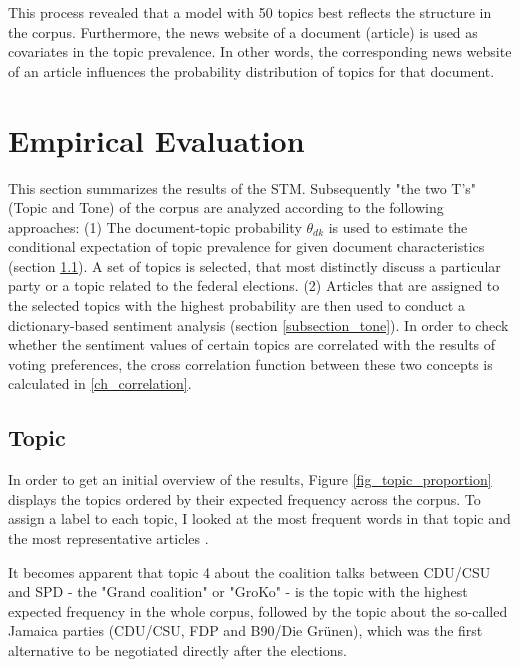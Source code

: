 \documentclass[12pt,a4paper,notitlepage]{article}
\begin{document}
This process revealed that a model with 50 topics best reflects the structure in the corpus. Furthermore, the news website of a document (article) is used as covariates in the topic prevalence. In other words, the corresponding news website of an article influences the probability distribution of topics for that document. 

\section{Empirical Evaluation}\label{ch_empirical}

This section summarizes the results of the STM. Subsequently "the two T's" (Topic and Tone) of the corpus are analyzed according to the following approaches: (1) The document-topic probability $\theta_{dk}$ is used to estimate the conditional expectation of topic prevalence for given document characteristics (section \ref{subsection_topic}). A set of topics is selected, that most distinctly discuss a particular party or a topic related to the federal elections. (2) Articles that are assigned to the selected topics with the highest probability are then used to conduct a dictionary-based sentiment analysis (section \ref{subsection_tone}). In order to check whether the sentiment values of certain topics are correlated with the results of voting preferences, the cross correlation function between these two concepts is calculated in \ref{ch_correlation}.

\subsection{Topic}\label{subsection_topic}

In order to get an initial overview of the results, Figure \ref{fig_topic_proportion} displays the topics ordered by their expected frequency across the corpus. To assign a label to each topic, I looked at the most frequent words in that topic and the most representative articles \citep{roberts_model_2016}. 

It becomes apparent that topic 4 about the coalition talks between CDU/CSU and SPD - the "Grand coalition" or "GroKo" - is the topic with the highest expected frequency in the whole corpus, followed by the topic about the so-called Jamaica parties (CDU/CSU, FDP and B90/Die Grünen), which was the first alternative to be negotiated directly after the elections.  
\end{document}
